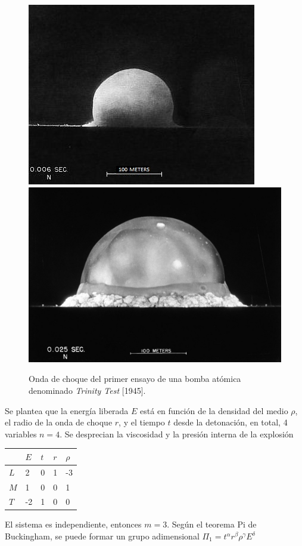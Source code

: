   \begin{figure}[thb!]
  	\centering
  	\includegraphics[width=0.9\linewidth]{fig/trinity1.jpg}
  	\includegraphics[width=0.9\linewidth]{fig/trinity2.jpg}
  	\caption{Onda de choque del primer ensayo de una bomba atómica denominado \textit{Trinity Test} [1945]. }
  	\label{fig:trinity}
  \end{figure}
 
 Se plantea que la energía liberada $E$ está en función de la densidad del medio $\rho$, el radio de la onda de choque $r$, y el tiempo $t$ desde la detonación, en total, 4 variables $n=4$. Se desprecian la viscosidad y la presión interna de la explosión
 
\begin{table}[htb!]
	\centering
	\begin{tabular}{l||l|lll}
		& $E$ & $t$ & $r$ & $\rho$ \\ \hline
		$L$ & 2   & 0   & 1   & -3     \\ \hline
		$M$ & 1   & 0   & 0   & 1      \\ \hline
		$T$ & -2  & 1   & 0   & 0     
	\end{tabular}
\end{table}
El sistema es independiente, entonces $m=3$. Según el teorema Pi de Buckingham, se puede formar un grupo adimensional $\Pi_1 = t^\alpha r^\beta \rho^\gamma E^\delta $
 
